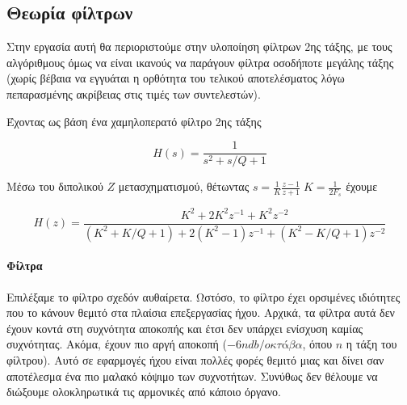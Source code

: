 \documentclass{article}
\begin{document}
\subsection{Θεωρία  φίλτρων}

Στην εργασία αυτή θα περιοριστούμε στην υλοποίηση φίλτρων 2ης τάξης, με τους 
αλγόριθμους όμως να είναι ικανούς να παράγουν φίλτρα οσοδήποτε μεγάλης τάξης (χωρίς 
βέβαια να εγγυάται η ορθότητα του τελικού αποτελέσματος λόγω πεπαρασμένης ακρίβειας 
στις τιμές των συντελεστών). 

Έχοντας ως βάση ένα χαμηλοπερατό φίλτρο 2ης τάξης \cite{OpenheimAlan}

\begin{equation}
    H(s) = \frac{1}{s^2 + s/Q + 1} 
    \label{eq:h_lowpassfilter}
\end{equation}

Μέσω του διπολικού $Z$ μετασχηματισμού, θέτωντας $s = \frac{1}{K}\frac{z-1}{z+1} \; K = \frac{1}{2F_s}$ έχουμε \cite{BilinearZTransformWeb}

\begin{equation}
    H(z) = \frac{K^2 + 2K^2 z^{-1} + K^2 z^{-2}}{(K^2 + K/Q + 1) + 2(K^2 - 1) z^{-1} + (K^2 - K/Q + 1) z^{-2}}
    \label{eq:h_z_final}
\end{equation}


\paragraph{Φίλτρα } 

Επιλέξαμε το φίλτρο  σχεδόν αυθαίρετα. Ωστόσο, το φίλτρο 
έχει ορσιμένες ιδιότητες που το κάνουν θεμιτό στα πλαίσια επεξεργασίας ήχου.
Αρχικά, τα φίλτρα αυτά δεν έχουν  κοντά στη συχνότητα αποκοπής 
και έτσι δεν υπάρχει ενίσχυση καμίας συχνότητας. Ακόμα, 
έχουν πιο αργή αποκοπή ($-6n db/οκτάβα$, όπου $n$ η τάξη του φίλτρου). 
Αυτό σε εφαρμογές ήχου είναι πολλές φορές θεμιτό μιας και δίνει σαν αποτέλεσμα ένα πιο μαλακό 
κόψιμο των συχνοτήτων. Συνύθως δεν θέλουμε να διώξουμε ολοκληρωτικά τις αρμονικές 
από κάποιο όργανο.
\end{document}
